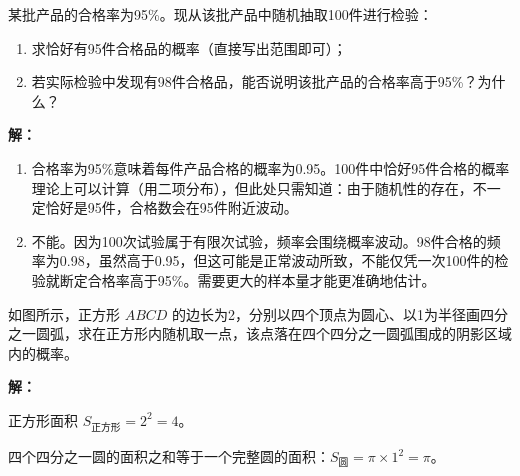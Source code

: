 \documentclass[12pt, a4paper]{ctexart}
\begin{document}
\begin{examplebox}[【例5】频率估计概率]
某批产品的合格率为95\%。现从该批产品中随机抽取100件进行检验：
\begin{enumerate}[label=(\arabic*)]
  \item 求恰好有95件合格品的概率（直接写出范围即可）；
  \item 若实际检验中发现有98件合格品，能否说明该批产品的合格率高于95\%？为什么？
\end{enumerate}
\end{examplebox}

\textbf{解：}
\begin{enumerate}[label=(\arabic*)]
  \item 合格率为95\%意味着每件产品合格的概率为0.95。100件中恰好95件合格的概率理论上可以计算（用二项分布），但此处只需知道：由于随机性的存在，不一定恰好是95件，合格数会在95件附近波动。

  \item 不能。因为100次试验属于有限次试验，频率会围绕概率波动。98件合格的频率为0.98，虽然高于0.95，但这可能是正常波动所致，不能仅凭一次100件的检验就断定合格率高于95\%。需要更大的样本量才能更准确地估计。
\end{enumerate}

\begin{examplebox}[【例6】几何概型]
如图所示，正方形 $ABCD$ 的边长为2，分别以四个顶点为圆心、以1为半径画四分之一圆弧，求在正方形内随机取一点，该点落在四个四分之一圆弧围成的阴影区域内的概率。

\begin{center}
\end{center}
\end{examplebox}

\textbf{解：}

正方形面积 $S_{\text{正方形}} = 2^2 = 4$。

四个四分之一圆的面积之和等于一个完整圆的面积：$S_{\text{圆}} = \pi \times 1^2 = \pi$。
\end{document}
